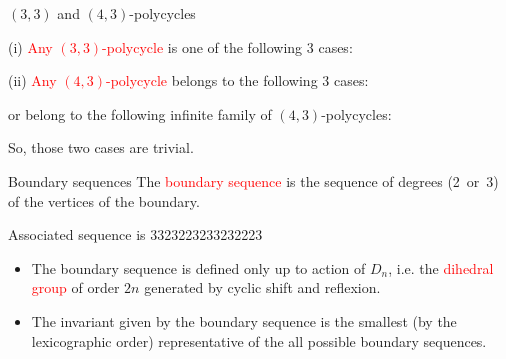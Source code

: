 \documentclass[%
pdf,
colorBG,
slideColor,
]{prosper}
\begin{document}
\begin{slide}{$(3,3)$ and $(4,3)$-polycycles}
{\it\scriptsize


(i) \textcolor{red}{Any $(3,3)$-polycycle} is one of the following $3$ cases:
\begin{center}
\end{center}

(ii) \textcolor{red}{Any $(4,3)$-polycycle} belongs to the following $3$ cases:
\begin{center}
\end{center}
\hspace{1cm}or belong to the following infinite family of $(4,3)$-polycycles:
\begin{center}
\end{center}

}
So, those two cases are trivial.

\end{slide}














\begin{slide}{Boundary sequences}
\vspace{-2mm}
The \textcolor{red}{boundary sequence} is the sequence of degrees (2~or~3) of the vertices of the boundary.
\begin{center}
\begin{minipage}{5cm}
\centering
{}
\end{minipage}
\begin{minipage}{5cm}
Associated sequence is
3323223233232223
\end{minipage}
\end{center}

\begin{itemize}
\item The boundary sequence is defined only up to action of $D_n$, i.e. the \textcolor{red}{dihedral group} of order $2n$ generated by cyclic shift and reflexion.
\item The invariant given by the boundary sequence is the smallest (by the lexicographic order) representative of the all possible boundary sequences.
\end{itemize}




\end{slide}
\end{document}
